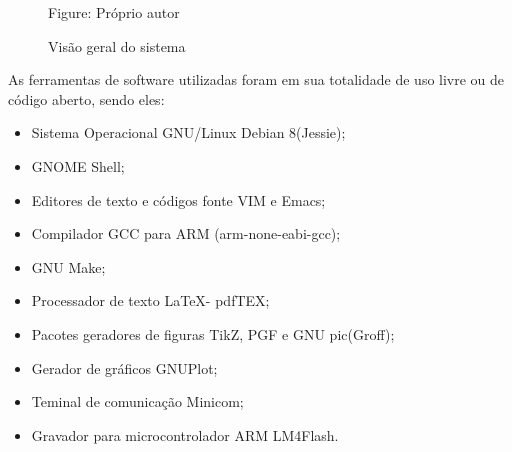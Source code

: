 \begin{figure}[!htb]
\center
\caption{Visão geral do sistema }

{\small Figure: Próprio autor}
\end{figure}

As ferramentas de software utilizadas foram em sua totalidade de uso
livre ou de código aberto, sendo eles:

\begin{itemize}
\item Sistema Operacional GNU/Linux Debian 8(Jessie);
\item GNOME Shell;
\item Editores de texto e códigos fonte VIM e Emacs;
\item Compilador GCC para ARM (arm-none-eabi-gcc);
\item GNU Make;
\item Processador de texto \LaTeX - pdfTEX; 
\item Pacotes geradores de figuras TikZ, PGF e GNU pic(Groff);
\item Gerador de gráficos GNUPlot;
\item Teminal de comunicação Minicom;
\item Gravador para microcontrolador ARM LM4Flash.
\end{itemize}










